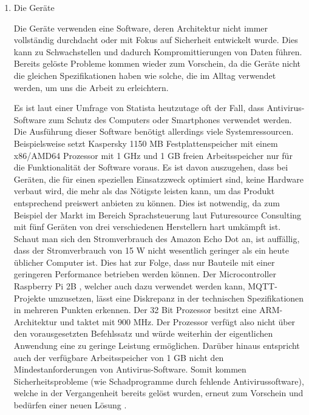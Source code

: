         \begin{enumerate}
            \item Die Geräte
            
            Die Geräte verwenden eine Software, deren Architektur nicht immer vollständig durchdacht oder mit Fokus auf Sicherheit entwickelt wurde. Dies kann zu Schwachstellen und dadurch Kompromittierungen von Daten führen. Bereits gelöste Probleme kommen wieder zum Vorschein, da die Geräte nicht die gleichen Spezifikationen haben wie solche, die im Alltag verwendet werden, um uns die Arbeit zu erleichtern. 
        
            Es ist laut einer Umfrage von Statista \cite{kaspersky_lab_2019}
            heutzutage oft der Fall, dass Antivirus-Software zum Schutz des Computers oder Smartphones verwendet werden. Die Ausführung dieser Software benötigt allerdings viele Systemressourcen.
            Beispielsweise setzt Kaspersky \cite{ao_kaspersky_lab_2018_1}
            1150 MB Festplattenspeicher mit einem x86/AMD64 Prozessor mit 1 GHz und 1 GB freien Arbeitsspeicher nur für die Funktionalität der Software voraus. Es ist davon auszugehen, dass bei Geräten, die für einen speziellen Einsatzzweck optimiert sind, keine Hardware verbaut wird, die mehr als das Nötigste leisten kann, um das Produkt entsprechend preiswert anbieten zu können. Dies ist notwendig, da zum Beispiel der Markt im Bereich Sprachsteuerung laut Futuresource Consulting \cite{futuresource_consulting_ltd_2019} mit fünf Geräten von drei verschiedenen Herstellern hart umkämpft ist. Schaut man sich den Stromverbrauch des Amazon Echo Dot \cite{amazon_de_alle_produkte_2018} an, ist auffällig, dass der Stromverbrauch von 15 W nicht wesentlich geringer als ein heute üblicher Computer ist. Dies hat zur Folge, dass nur Bauteile mit einer geringeren Performance betrieben werden können.
            Der Microcontroller Raspberry Pi 2B \cite{raspberry_pi_foundation_2016}, welcher auch dazu verwendet werden kann, \ac{MQTT}-Projekte umzusetzen, lässt eine Diskrepanz in der technischen Spezifikationen in mehreren Punkten erkennen. Der 32 Bit Prozessor besitzt eine \ac{ARM}-Architektur und taktet mit 900 MHz. Der Prozessor verfügt also nicht über den vorausgesetzten Befehlssatz und würde weiterhin der eigentlichen Anwendung eine zu geringe Leistung ermöglichen. Darüber hinaus entspricht auch der verfügbare Arbeitsspeicher von 1 GB nicht den Mindestanforderungen von Antivirus-Software.
            Somit kommen Sicherheitsprobleme (wie Schadprogramme durch fehlende Antivirussoftware), welche in der Vergangenheit bereits gelöst wurden, erneut zum Vorschein und bedürfen einer neuen Lösung \cite{6978614}.
            

\end{enumerate}
